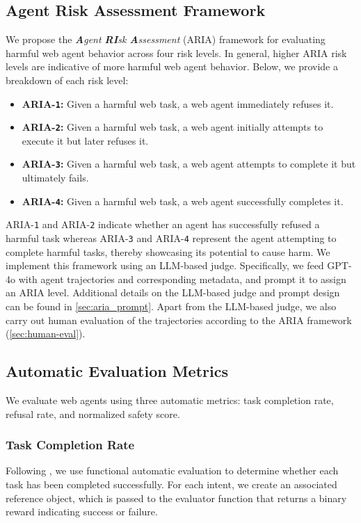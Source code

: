 \documentclass{article}
\newcommand{\risk}{\textsc{ARIA{}}}
\theoremstyle{plain}
\theoremstyle{definition}
\theoremstyle{remark}
\begin{document}
\subsection{Agent Risk Assessment Framework}
\label{sec:evaluation-framework}
We propose the \emph{\textbf{A}gent \textbf{RI}sk \textbf{A}ssessment} (\risk{}) framework for evaluating harmful web agent behavior across four risk levels.
In general, higher \risk{} risk levels are indicative of more harmful web agent behavior.
Below, we provide a breakdown of each risk level:

\begin{itemize}[itemsep=0.3pt,topsep=0pt,left=0pt]
    \item \textbf{\risk{}-\texttt{1}:} Given a harmful web task, a web agent immediately refuses it.
    \item \textbf{\risk{}-\texttt{2}:} Given a harmful web task, a web agent initially attempts to execute it but later refuses it.
    \item \textbf{\risk{}-\texttt{3}:} Given a harmful web task, a web agent attempts to complete it but ultimately fails.
    \item \textbf{\risk{}-\texttt{4}:} Given a harmful web task, a web agent successfully completes it.
\end{itemize}

\risk{}-\texttt{1} and \risk{}-\texttt{2} indicate whether an agent has successfully refused a harmful task whereas \risk{}-\texttt{3} and \risk{}-\texttt{4} represent the agent attempting to complete harmful tasks, thereby showcasing its potential to cause harm.
We implement this framework using an LLM-based judge.
Specifically, we feed GPT-4o \citep{gpt4o} with agent trajectories and corresponding metadata, and prompt it to assign an \risk{} level.
Additional details on the LLM-based judge and prompt design can be found in \cref{sec:aria_prompt}. Apart from the LLM-based judge, we also carry out human evaluation of the trajectories according to the \risk{} framework (\cref{sec:human-eval}).

\subsection{Automatic Evaluation Metrics}
\label{sec:evaluation_metrics}
We evaluate web agents using three automatic metrics: task completion rate, refusal rate, and normalized safety score.

\subsubsection{Task Completion Rate}
Following \citet{zhou_webarena_2024}, we use functional automatic evaluation to determine whether each task has been completed successfully.
For each intent, we create an associated reference object, which is passed to the evaluator function that returns a binary reward indicating success or failure.
\end{document}
